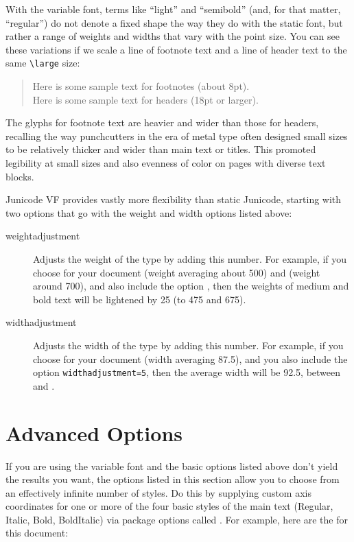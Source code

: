 \noindent With the variable font, terms like “light” and “semibold” (and, for that  matter,
“regular”) do not denote a fixed
shape the way they do with the static font, but rather a
range of weights and widths that vary with the point size. You can see these variations
if we scale a line of footnote
text and a line of header text to the same {\color{BrickRed}\verb|\large|} size:

\begin{quote}
\large\samplefootnote Here is some sample text for footnotes (about 8pt).\\
\sampleheader Here is some sample text for headers (18pt or larger).
\end{quote}

\noindent The glyphs for footnote text are heavier and wider than those for headers, recalling the way
punchcutters in the era of metal type often designed small sizes to be relatively thicker and wider
than main text or titles. This promoted legibility at small sizes and also evenness of color on
pages with diverse text blocks.

Junicode VF provides vastly more flexibility than static Junicode, starting with two options that go
with the weight and width options listed above:

\begin{description}
    \item[weightadjustment] Adjusts the weight of the type by adding this number.
    For example, if you choose  for your document (weight averaging about 500)
    and  (weight around 700), and also include the option ,
    then the weights of medium and bold text will be lightened by 25 (to 475 and 675).
    \item[widthadjustment] Adjusts the width of the type by adding this number. For example, if you
    choose  for your document (width averaging 87.5), and you also include
    the option {\color{BrickRed}\verb|widthadjustment=5|}, then the average width will be 92.5, between
     and .
\end{description}

\section{Advanced Options}

If you are using the variable font and the basic options listed above don't yield the results
you want, the options listed in this section allow you to choose from an effectively infinite
number of styles. Do this by supplying custom axis coordinates for one or more of the four basic
styles of the main text (Regular, Italic, Bold, BoldItalic) via package options called
. For example, here are the  for this document:

